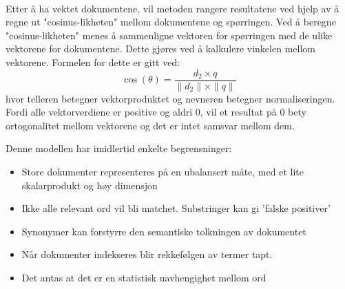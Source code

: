 \paragraph{}
Etter å ha vektet dokumentene, vil metoden rangere resultatene ved hjelp av å regne ut "cosinus-likheten" mellom dokumentene og spørringen. Ved å beregne "cosinus-likheten" menes å sammenligne vektoren for spørringen med de ulike vektorene for dokumentene. Dette gjøres ved å kalkulere vinkelen mellom vektorene. Formelen for dette er gitt ved:
\[
\cos(\theta) = \frac{d_2 \times q}{\parallel d_2 \parallel \times \parallel q \parallel}
\]
hvor telleren betegner vektorproduktet og nevneren betegner normaliseringen. Fordi alle vektorverdiene er positive og aldri 0, vil et resultat på 0 bety ortogonalitet mellom vektorene og det er intet samsvar mellom dem.

Denne modellen har imidlertid enkelte begrensninger:
\begin{itemize}
\item{Store dokumenter representeres på en ubalansert måte, med et lite skalarprodukt og høy dimensjon}
\item{Ikke alle relevant ord vil bli matchet. Substringer kan gi 'falske positiver'}
\item{Synonymer kan forstyrre den semantiske tolkningen av dokumentet}
\item{Når dokumenter indekseres blir rekkefølgen av termer tapt.}
\item{Det antas at det er en statistisk uavhengighet mellom ord}
\end{itemize}



